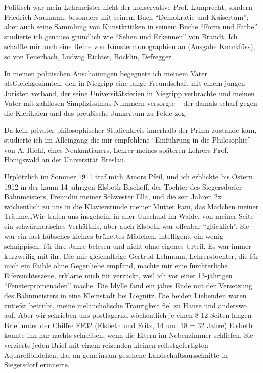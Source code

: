 \documentclass[a5paper,pagesize,10pt,twoside=true]{scrbook}
\begin{document}
Politisch war mein Lehrmeister nicht der konservative Prof. Lamprecht, sondern Friedrich Naumann, besonders mit seinem Buch \enquote{Demokratie und Kaisertum}; aber auch seine Sammlung von Kunstkritiken in seinem Buche \enquote{Form und Farbe} studierte ich genauso gründlich wie \enquote{Sehen und Erkennen} von Brandt. Ich schaffte mir auch eine Reihe von Künstermonographien an (Ausgabe Knackfüss), so von Feuerbach, Ludwig Richter, Böcklin, Defregger.

In meinen politischen Anschauungen begegnete ich meinem Vater als\linebreak Gleichgesinnten, den in Niegripp eine lange Freundschaft mit einem jungen Juristen verband, der seine Universitätsferien in Niegripp verbrachte und meinen Vater mit zahllosen Simplizissimus-Nummern versorgte -- der damals scharf gegen die Klerikalen und das preußische Junkertum zu Felde zog.

Da kein privater philosophischer Studienkreis innerhalb der Prima zustande kam, studierte ich im Alleingang die mir empfohlene \enquote{Einführung in die Philosophie} von A. Riehl, eines Neukantianers, Lehrer meines späteren Lehrers Prof. Hönigswald an der Universität Breslau. 

Urplötzlich im Sommer 1911 traf mich Amors Pfeil, und ich erblickte bis Ostern 1912 in der kaum 14-jährigen Elsbeth Bischoff, der Tochter des Siegersdorfer Bahnmeisters, Freundin meiner Schwester Ella, und die seit Jahren 2x wöchentlich zu uns in die Klavierstunde meiner Mutter kam, das Mädchen meiner Träume\dots Wir trafen uns insgeheim in aller Unschuld im Walde, von meiner Seite ein schwärmerisches Verhältnis, aber auch Elsbeth war offenbar \enquote{glücklich}. Sie war ein fast hübsches kleines brünettes Mädchen, intelligent, ein wenig schnippisch, für ihre Jahre belesen und nicht ohne eigenes Urteil. Es war immer kurzweilig mit ihr. Die mir gleichaltrige Gertrud Lehmann, Lehrerstochter, die für mich ein Faible ohne Gegenliebe empfand, machte mir eine fürchterliche Eifersuchtsszene, erklärte mich für verrückt, weil ich vor einer 13-jährigen \enquote{Fensterpromenaden} mache. Die Idylle fand ein jähes Ende mit der Versetzung des Bahnmeisters in eine Kleinstadt bei Liegnitz. Die beiden Liebenden waren zutiefst betrübt, meine melancholische Traurigkeit fiel zu Hause und anderswo auf. Aber wir schrieben uns postlagernd wöchentlich je einen 8-12 Seiten langen Brief unter der Chiffre EF32 (Elsbeth und Fritz, 14 und 18 = 32 Jahre) Elsbeth konnte ihn nur nachts schreiben, wenn die Eltern im Nebenzimmer schliefen. Sie verzierte jeden Brief mit einem reizenden kleinen selbstgefertigten Aquarellbildchen, das an gemeinsam gesehene Landschaftsausschnitte in Siegersdorf erinnerte.
\end{document}
